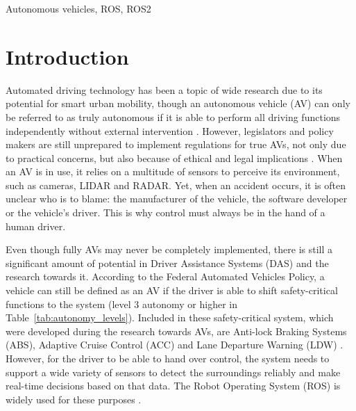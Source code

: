 \documentclass[conference,a4paper]{IEEEtran}
\begin{document}
\setlength{\parskip}{0em}
\setlength{\parindent}{10pt}
\begin{keywords}
Autonomous vehicles, ROS, ROS2
\end{keywords}

\setlength{\parskip}{0em}
\setlength{\parindent}{0pt}
\section{Introduction}

\setlength{\parskip}{0em}
\setlength{\parindent}{10pt}
Automated driving technology has been a topic of wide research due to its potential for smart urban mobility, though an autonomous vehicle (AV) can only be referred to as truly autonomous if it is able to perform all driving functions independently without external intervention \cite{Faisal2019}. 
However, legislators and policy makers are still unprepared to implement regulations for true AVs, not only due to practical concerns, but also because of ethical and legal implications \cite{Martinho2021}. 
When an AV is in use, it relies on a multitude of sensors to perceive its environment, such as cameras, LIDAR and RADAR. 
Yet, when an accident occurs, it is often unclear who is to blame: the manufacturer of the vehicle, the software developer or the vehicle’s driver. 
This is why control must always be in the hand of a human driver.

\setlength{\parskip}{1em}
\setlength{\parindent}{10pt}
Even though fully AVs may never be completely implemented, there is still a significant amount of potential in Driver Assistance Systems (DAS) and the research towards it. 
According to the Federal Automated Vehicles Policy, a vehicle can still be defined as an AV if the driver is able to shift \mbox{safety-critical} functions to the system \cite{DoT2016} (level 3 autonomy or higher in Table~\ref{tab:autonomy_levels}). 
Included in these \mbox{safety-critical} system, which were developed during the research towards AVs, are \mbox{Anti-lock} Braking Systems (ABS), Adaptive Cruise Control (ACC) and Lane Departure Warning (LDW) \cite{Marin2019, Lengyel2020}. 
However, for the driver to be able to hand over control, the system needs to support a wide variety of sensors to detect the surroundings reliably and make \mbox{real-time} decisions based on that data. 
The Robot Operating System (ROS) is widely used for these purposes \cite{Enright2024}.
\end{document}
